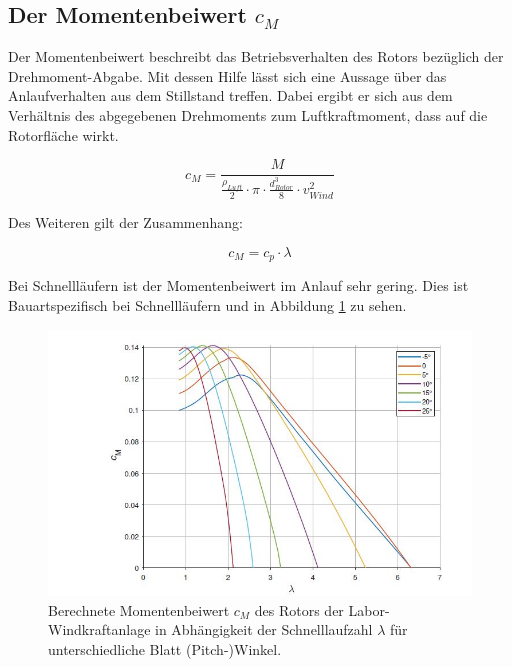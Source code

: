 \newpage
\subsection{Der Momentenbeiwert \texorpdfstring{$c_M$}{}}

Der Momentenbeiwert beschreibt das Betriebsverhalten des Rotors bezüglich der Drehmoment-Abgabe. Mit dessen Hilfe lässt sich eine Aussage über das Anlaufverhalten aus dem Stillstand treffen. Dabei ergibt er sich aus dem Verhältnis des abgegebenen Drehmoments zum Luftkraftmoment, dass auf die Rotorfläche wirkt.

\begin{equation}
  c_{M}= \frac{M}{ \frac{\rho_{Luft}}{2}\cdot \pi \cdot \frac{d^3_{Rotor}}{8} \cdot v^2_{Wind} }
    \label{eq:Momentenbeiwert_cm}
\end{equation}

Des Weiteren gilt der Zusammenhang:

\begin{equation}
  c_{M}= c_{p} \cdot \lambda
    \label{eq:Momentenbeiwert_cm2}
\end{equation}

Bei Schnellläufern ist der Momentenbeiwert im Anlauf sehr gering. Dies ist Bauartspezifisch bei Schnellläufern und in Abbildung \ref{fig:cmzulambda} zu sehen.

\begin{figure}[H]
    \centering
    \includegraphics[width=1\textwidth]{Abbildungen/cm.jpg}
    \caption{Berechnete Momentenbeiwert $c_{M}$ des Rotors der Labor-Windkraftanlage in Abhängigkeit der Schnelllaufzahl $\lambda$ für unterschiedliche Blatt (Pitch-)Winkel.\cite{Anleitung} }
    \label{fig:cmzulambda}
\end{figure}
\newpage
